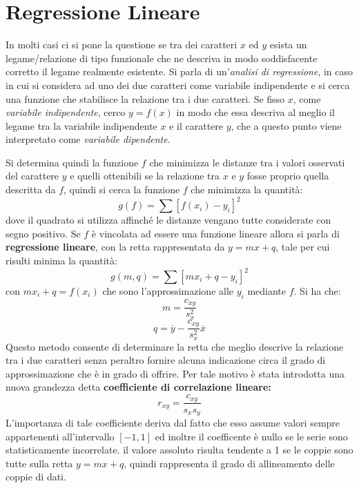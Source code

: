 \documentclass[a4paper,12pt, oneside]{book}
\begin{document}
\section{Regressione Lineare}
In molti casi ci si pone la questione se tra dei caratteri $x$ ed $y$ esista un legame/relazione di tipo funzionale
che ne descriva in modo soddisfacente corretto il legame realmente esistente.\newline
Si parla di un'\emph{analisi di regressione}, in caso in cui si considera ad uno dei due caratteri 
come variabile indipendente e si cerca una funzione che stabilisce la relazione tra i due caratteri.\newline
Se fisso $x$, come \emph{variabile indipendente}, cerco $y = f(x)$ in modo che essa descriva al meglio
il legame tra la variabile indipendente $x$ e il carattere $y$, che a questo punto viene 
interpretato come \emph{variabile dipendente}.

Si determina quindi la funzione $f$ che minimizza le distanze tra i valori osservati del carattere $y$
e quelli ottenibili se la relazione tra $x$ e $y$ fosse proprio quella descritta da $f$, 
quindi si cerca la funzione $f$ che minimizza la quantità:
\[ g(f) = \sum[f(x_i)-y_i]^2 \]
dove il quadrato si utilizza affinché le distanze vengano tutte considerate con segno positivo.\newline
Se $f$ è vincolata ad essere una funzione lineare allora si parla di \textbf{regressione lineare}, 
con la retta rappresentata da $y=mx+q$, tale per cui risulti minima la quantità:
\[ g(m,q) = \sum[mx_i+q-y_i]^2 \]
con $mx_i+q=f(x_i)$ che sono l'approssimazione alle $y_i$ mediante $f$.\newline
Si ha che:
\[ m = \frac{c_{xy}}{s^2_x} \]
\[ q = \overline{y} - \frac{c_{xy}}{s_x^2}\overline{x} \]
Questo metodo consente di determinare la retta che meglio descrive la relazione tra i due caratteri 
senza peraltro fornire alcuna indicazione circa il grado di approssimazione che è in grado di offrire.\newline
Per tale motivo è stata introdotta una nuova grandezza detta \textbf{coefficiente di correlazione lineare:}
\[ r_{xy}=\frac{c_{xy}}{s_xs_y} \]
L'importanza di tale coefficiente deriva dal fatto che esso assume valori sempre appartenenti all'intervallo $[-1, 1]$ 
ed inoltre il coefficente è nullo se le serie sono statisticamente incorrelate.\newline
il valore assoluto risulta tendente a 1 se le coppie sono tutte sulla retta $y=mx+q$,
quindi rappresenta il grado di allineamento delle coppie di dati.
\end{document}
